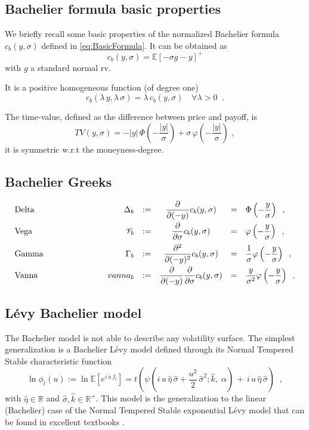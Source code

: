 \documentclass[12pt]{article}
\theoremstyle{definition}
\theoremstyle{remark}
\numberwithin{theorem}{section}
\numberwithin{proposition}{section}
\numberwithin{lemma}{section}
\numberwithin{corollary}{section}
\numberwithin{definition}{section}
\numberwithin{remark}{section}
\numberwithin{example}{section}
\newcommand{\E}{\mathbb{E}}
\newcommand{\be}{\begin{equation}}
\newcommand{\en}{\end{equation}}
\begin{document}
\subsection*{Bachelier formula basic properties}

We briefly recall some basic properties of the normalized Bachelier formula $ c_b (y, \sigma)$ defined in \eqref{eq:BasicFormula}. It can be obtained as
\[
c_b (y, \sigma) = \E[ - \sigma g -y]^+
\]
with $g$ a standard normal rv.

It is a positive homogeneous function (of degree one)
\be
 c_b(\lambda \, y, \lambda \, \sigma)  =  \lambda \, c_b(y, \sigma) \quad  \forall \lambda>0 \;\; .
\label{eq:hom}
\en

The time-value, defined as the difference between price and payoff, is
\[
TV(y,\sigma) =- |y| \, \Phi \left( - \frac{|y|}{\sigma} \right) + \sigma \, \varphi \left( - \frac{|y|}{\sigma} \right)\,\,,
\]
it is symmetric w.r.t the moneyness-degree.

\subsection*{Bachelier Greeks}

\be
\label{eq:Vega}
\begin{array}{lp{2cm}rcccl}
{\rm Delta} & & \Delta_b & := & \displaystyle \frac{\partial}{\partial (-y)} c_b (y, \sigma) & = & \displaystyle  \Phi \left( - \frac{y}{\sigma} \right) \;\; , \\[3mm]
{\rm Vega} & & {\cal V}_b & := & \displaystyle  \frac{\partial}{\partial \sigma} c_b (y, \sigma) & = & \displaystyle  \varphi \left( - \frac{y}{\sigma} \right) \;\; , \\[3mm]
{\rm Gamma} & & \Gamma_b & := & \displaystyle  \frac{\partial^2}{\partial (-y)^2} c_b (y, \sigma)  & = & \displaystyle \frac{1}{\sigma} 
\varphi \left( - \frac{y}{\sigma} \right)  \;\; , \\[3mm]
{\rm Vanna} & & vanna_b & := & \displaystyle   \frac{\partial}{\partial (-y)}
\frac{\partial}{\partial \sigma} 
c_b (y, \sigma)   & = & \displaystyle \frac{y}{\sigma^2}
\varphi \left( -  \frac{y}{\sigma}\right)   \;\; .
\end{array}
\en

\subsection*{L\'evy Bachelier model}
The Bachelier model is not able to describe any volatility surface.
The simplest generalization is a Bachelier L\'evy model defined through its Normal Tempered Stable characteristic function
\begin{equation}
\label{eq:ChFunLevy}
	\ln \phi_t(u):= \ln \mathbb{E}\left[e^{ i \, u \, f_t}\right]=
	t\left(\psi\left(i \, u \, \hat{\eta} \,  \hat{\sigma}
+\frac{u^2 }{2} \, \hat{\sigma}^2 ;  \hat{k}, \; \alpha \right) \, + \,
 i\, u \, \hat{\eta}\,\hat{\sigma} \right)\;\;,
\end{equation}
with $\hat{\eta} \in \mathbb{R}$ and $\hat{\sigma}, \hat{k} \in \mathbb{R}^+$.
This model is the generalization to the linear (Bachelier) case of the Normal Tempered Stable 
 exponential L\'evy model that can be found in excellent textbooks \citep[see, e.g.,][]{Cont}.
 
\end{document}
